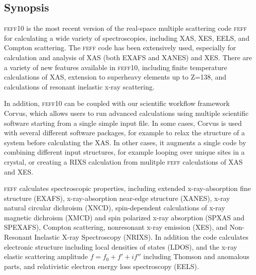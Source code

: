 \documentclass[11pt,oneside]{report} %
\newcommand{\feffcurrent}{\textsc{feff10}}
\newcommand{\program}[1]{\textsc{#1}}
\newcommand{\feff}{\program{feff}}
\begin{document}
\begin{latexonly}
\newchapter{}
\tableofcontents
\newchapter{}

\setcounter{page}{1}









\chapter{Synopsis}
\label{sec:Synopsis}

{\feffcurrent} is the most recent version of the real-space multiple scattering code {\feff} for calculating a wide variety of spectroscopies, including XAS, XES, EELS, and Compton scattering. The {\feff} code has been extensively used, especially for calculation and analysis of XAS (both EXAFS and XANES) and XES. There are a variety of new features available in {\feffcurrent}, including finite temperature calculations of XAS, extension to superheavy elements up to Z=138, and calculations of resonant inelastic x-ray scattering.

In addition, {\feffcurrent} can be coupled with our scientific workflow framework Corvus, which allows users to run advanced calculations using multiple scientific software starting from a single simple input file. In some cases, Corvus is used with several different software packages, for example to relax the structure of a system before calculating the XAS. In other cases, it augments a single code by combining different input structures, for example looping over unique sites in a crystal, or creating a RIXS calculation from mulitple {\feff} calculations of XAS and XES.

{\feff} calculates spectroscopic properties, including
extended x-ray-absorption fine structure (EXAFS), 
x-ray-absorption near-edge structure (XANES), x-ray
natural circular dichroism (XNCD), spin-dependent calculations 
of x-ray magnetic dichroism (XMCD) and spin polarized x-ray absorption 
(SPXAS and SPEXAFS), Compton scattering, nonresonant x-ray emission (XES), and Non-Resonant
Inelastic X-ray Spectroscopy (NRIXS). 
In addition the code calculates electronic structure including local
densities of states (LDOS), and the x-ray elastic scattering amplitude
$f=f_0+f'+if''$ including Thomson and anomalous parts, and relativistic
electron energy loss spectroscopy (EELS). 


\end{latexonly}
\end{document}
